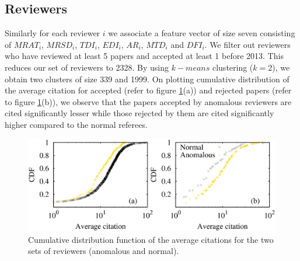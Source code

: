 \subsection{Reviewers}

Similarly for each reviewer $i$ we associate a feature vector of size seven consisting of $MRAT_{i}$, $MRSD_{i}$, $TDI_{i}$, $EDI_{i}$, $AR_{i}$, $MTD_{i}$ and $DFI_{i}$. 
We filter out reviewers who have reviewed at least 5 papers and accepted at least 1 before 2013. This reduces our set of reviewers to 2328. By using $k-means$ clustering ($k=2$), we obtain two clusters of size 339 and 
1999. On plotting cumulative distribution of the average citation for accepted (refer to figure \ref{rev_pred}(a)) and rejected papers (refer to figure \ref{rev_pred}(b)), we observe that the papers accepted by anomalous reviewers are cited significantly lesser while those rejected by them are cited significantly higher compared to the normal referees.

\begin{figure}
\centering
\includegraphics[scale=0.27]{figures/reviewer_all_anom.eps}
\caption{\label{rev_pred}Cumulative distribution function of the average citations for the two sets of reviewers (anomalous and normal).}
\vspace{-.4cm}
\end{figure}
\medskip